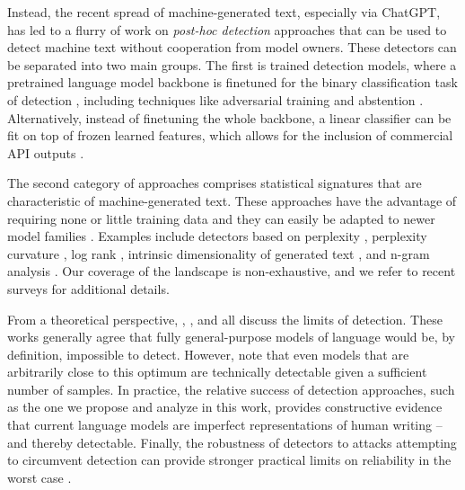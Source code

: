 \documentclass{article} %
\begin{document}
Instead, the recent spread of machine-generated text, especially via ChatGPT, has led to a flurry of work on \textit{post-hoc detection} approaches that can be used to detect machine text without cooperation from model owners. 
These detectors can be separated into two main groups. 
The first is trained detection models, where a pretrained language model backbone is finetuned for the binary classification task of detection \citep{solaiman_release_2019,zellers_defending_2019,yu_gpt_2023,zhan_g3detector_2023}, including techniques like adversarial training \citep{hu_radar_2023} and abstention \citep{tian_multiscale_2023}. 
Alternatively, instead of finetuning the whole backbone, a linear classifier can be fit on top of frozen learned features, which allows for the inclusion of commercial API outputs  \citep{verma_ghostbuster_2023}.

The second category of approaches comprises statistical signatures that are characteristic of machine-generated text. 
These approaches have the advantage of requiring none or little training data and they can easily be adapted to newer model families \citep{pu_unraveling_2022}. 
Examples include detectors based on perplexity \citep{tian_new_2023, vasilatos_howkgpt_2023,wang_m4_2023}, perplexity curvature \citep{mitchell_detectgpt_2023}, log rank \citep{su_detectllm_2023}, intrinsic dimensionality of generated text \citep{tulchinskii_intrinsic_2023}, and n-gram analysis \citep{yang_dna-gpt_2023}. 
Our coverage of the landscape is non-exhaustive, and we refer to recent surveys \citet{ghosal2023towards,tang_science_2023,dhaini_detecting_2023,guo_how_2023}  for additional details. %

From a theoretical perspective, \citet{varshney_limits_2020}, \citet{helm_statistical_2023}, and \citet{sadasivan_can_2023} all discuss the limits of detection.
These works generally agree that fully general-purpose models of language would be, by definition, impossible to detect. 
However, \citet{chakraborty_possibilities_2023} note that even models that are arbitrarily close to this optimum are technically detectable given a sufficient number of samples. 
In practice, the relative success of detection approaches, such as the one we propose and analyze in this work, provides constructive evidence that current language models are imperfect representations of human writing -- and thereby detectable. 
Finally, the robustness of detectors to attacks attempting to circumvent detection can provide stronger practical limits on reliability in the worst case \citep{bhat_how_2020,wolff_attacking_2022,liyanage_detecting_2023}.
\end{document}
